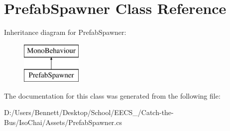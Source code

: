 \hypertarget{class_prefab_spawner}{}\section{Prefab\+Spawner Class Reference}
\label{class_prefab_spawner}
Inheritance diagram for Prefab\+Spawner\+:\begin{figure}[H]
\begin{center}
\leavevmode
\includegraphics[height=2.000000cm]{class_prefab_spawner}
\end{center}
\end{figure}


The documentation for this class was generated from the following file\+:\begin{DoxyCompactItemize}
\item 
D\+:/\+Users/\+Bennett/\+Desktop/\+School/\+E\+E\+C\+S\+\_/\+Catch-\/the-\/\+Bus/\+Iso\+Chai/\+Assets/Prefab\+Spawner.\+cs\end{DoxyCompactItemize}
